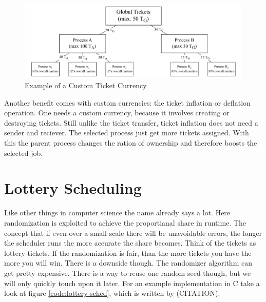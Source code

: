 \begin{figure}[h]
    \centering
    \includegraphics[width=\textwidth]{Assets/Ticket-Currency.pdf}
    \caption{Example of a Custom Ticket Currency}
    \label{fig:ticket-currencies}
\end{figure}
 
Another benefit comes with custom currencies: the ticket inflation or deflation operation.
One needs a custom currency, because it involves creating or destroying tickets. 
Still unlike the ticket transfer, ticket inflation does not need a sender and reciever.
The selected process just get more tickets assigned.
With this the parent process changes the ration of ownership and therefore boosts the selected job.


\section{Lottery Scheduling}

Like other things in computer science the name already says a lot. 
Here randomization is exploited to achieve the proportianal share in runtime.
The concept that if even over a small scale there will be unavoidable errors, the longer the scheduler runs the more accurate the share becomes.
Think of the tickets as lottery tickets.
If the randomization is fair, than the more tickets you have the more you will win.
There is a downside though.
The randomizer algorithm can get pretty expensive.
There is a way to reuse one random seed though, but we will only quickly touch upon it later.
For an example implementation in C take a look at figure \ref{code:lottery-sched}, which is written by (CITATION).

\newpage

